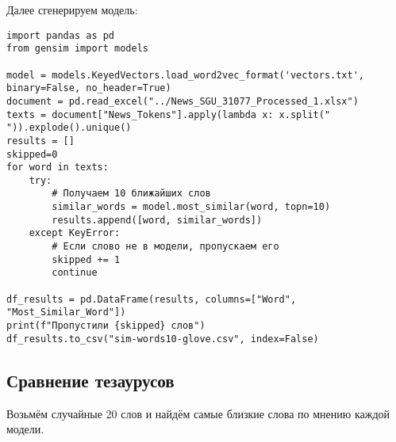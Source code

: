 \documentclass[coursework]{SCWorks}
\begin{document}
Далее сгенерируем модель:
\begin{verbatim}
import pandas as pd
from gensim import models

model = models.KeyedVectors.load_word2vec_format('vectors.txt', binary=False, no_header=True)
document = pd.read_excel("../News_SGU_31077_Processed_1.xlsx")
texts = document["News_Tokens"].apply(lambda x: x.split(" ")).explode().unique()
results = []
skipped=0
for word in texts:
    try:
        # Получаем 10 ближайших слов
        similar_words = model.most_similar(word, topn=10)
        results.append([word, similar_words])
    except KeyError:
        # Если слово не в модели, пропускаем его
        skipped += 1
        continue

df_results = pd.DataFrame(results, columns=["Word", "Most_Similar_Word"])
print(f"Пропустили {skipped} слов")
df_results.to_csv("sim-words10-glove.csv", index=False)
\end{verbatim}
\subsection{Сравнение тезаурусов}
Возьмём случайные 20 слов и найдём самые близкие слова по мнению каждой модели.
\end{document}
